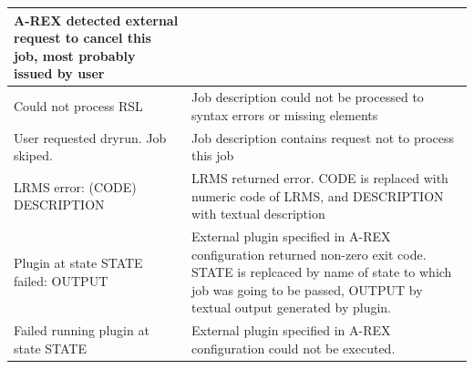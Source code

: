 \documentclass{article}                            %
\begin{document}
\begin{longtable}{|p{5cm}|p{10cm}|}
A-REX detected external request to cancel this job, most probably
issued by user\tabularnewline
\hline
Could not process RSL&
Job description could not be processed to syntax errors or missing
elements\tabularnewline
\hline
User requested dryrun. Job skiped.&
Job description contains request not to process this job\tabularnewline
\hline
LRMS error: (CODE) DESCRIPTION&
LRMS returned error. CODE is replaced with numeric code of LRMS, and
DESCRIPTION with textual description\tabularnewline
\hline
Plugin at state STATE failed: OUTPUT&
External plugin specified in A-REX configuration returned non-zero
exit code. STATE is replcaced by name of state to which job was going
to be passed, OUTPUT by textual output generated by plugin.\tabularnewline
\hline
Failed running plugin at state STATE&
External plugin specified in A-REX configuration could not be executed.\tabularnewline
\hline
\end{longtable}
\end{document}
